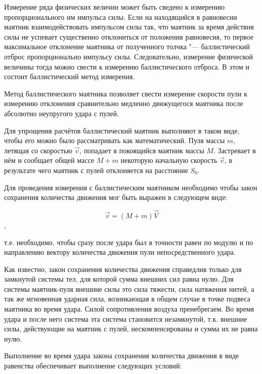 Измерение ряда физических величин может быть сведено к измерению пропорционального им импульса силы.
Если на находящийся в равновесии маятник взаимодействовать импульсом силы так,
что маятник за время действия силы не успевает существенно отклониться от положения равновесия,
то первое максимальное отклонение маятника от полученного толчка "--- баллистический отброс пропорционально импульсу силы.
Следовательно, измерение физической величины тогда можно свести к измерению баллистического отброса.
В этом и состоит баллистический метод измерения.

Метод баллистического маятника позволяет свести измерение скорости пули
к измерению отклонения сравнительно медленно движущегося маятника после
абсолютно неупругого удара с пулей.

Для упрощения расчётов баллистический маятник выполняют в таком виде,
чтобы его можно было рассматривать как математический.
Пуля массы $m$, летящая со скоростью $\vec{v}$, попадает в покоящийся маятник массы $M$.
Застревает в нём и сообщает общей массе $M + m$ некоторую начальную скорость $\vec{v}$,
в результате чего маятник с пулей отклоняется на расстояние $S_0$.

Для проведения измерения с баллистическим маятником необходимо чтобы закон сохранения количества движения мог быть выражен в следующем виде:

\begin{equation}
        \vec{v}=(M+m)\vec{V}
\end{equation},

т.е. необходимо, чтобы сразу после удара был в точности равен по модулю и по направлению вектору количества движения пули непосредственного удара.

Как известно, закон сохранения количества движения справедлив только для замкнутой системы тел, для которой сумма внешних сил равна нулю.
Для системы маятник-пуля внешние силы это сила тяжести, сила натяжения нитей, а так же мгновенная ударная сила, возникающая в общем случае в точке подвеса маятника во время удара.
Силой сопротивления воздуха пренебрегаем. Во время удара и после него система эта система становится незамкнутой, т.к. внешние силы, действующие на маятник с пулей, нескомпенсированы и сумма их не равна нулю.

Выполнение во время удара закона сохранения количества движения в виде равенства обеспечивает выполнение следующих условий:

